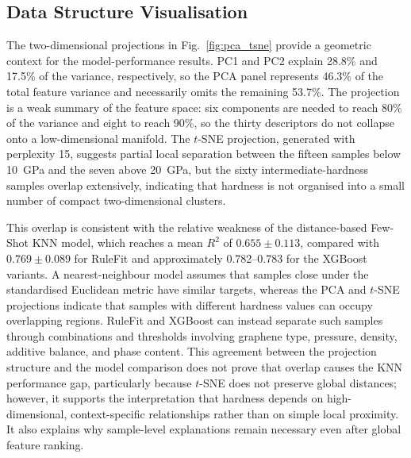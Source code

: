 \documentclass[pdflatex,sn-mathphys-num]{sn-jnl}%
\newif\ifrevmarks%
\newcommand{\revmark}[1]{\ifrevmarks\textcolor{revblue}{#1}\else#1\fi}%
\theoremstyle{thmstyleone}%
\theoremstyle{thmstyletwo}%
\theoremstyle{thmstylethree}%
\begin{document}
\subsection{Data Structure Visualisation}
\label{sec:datastructure}

\revmark{The two-dimensional projections in Fig.~\ref{fig:pca_tsne} provide a geometric context for the model-performance results. PC1 and PC2 explain 28.8\% and 17.5\% of the variance, respectively, so the PCA panel represents 46.3\% of the total feature variance and necessarily omits the remaining 53.7\%. The projection is a weak summary of the feature space: six components are needed to reach 80\% of the variance and eight to reach 90\%, so the thirty descriptors do not collapse onto a low-dimensional manifold. The $t$-SNE projection, generated with perplexity 15, suggests partial local separation between the fifteen samples below 10~GPa and the seven above 20~GPa, but the sixty intermediate-hardness samples overlap extensively, indicating that hardness is not organised into a small number of compact two-dimensional clusters.}

This overlap is consistent with the relative weakness of the distance-based Few-Shot KNN model, which reaches a mean $R^2$ of $0.655 \pm 0.113$, compared with $0.769 \pm 0.089$ for RuleFit and approximately 0.782--0.783 for the XGBoost variants. A nearest-neighbour model assumes that samples close under the standardised Euclidean metric have similar targets, whereas the PCA and $t$-SNE projections indicate that samples with different hardness values can occupy overlapping regions. RuleFit and XGBoost can instead separate such samples through combinations and thresholds involving graphene type, pressure, density, additive balance, and phase content. This agreement between the projection structure and the model comparison does not prove that overlap causes the KNN performance gap, particularly because $t$-SNE does not preserve global distances; however, it supports the interpretation that hardness depends on high-dimensional, context-specific relationships rather than on simple local proximity. It also explains why sample-level explanations remain necessary even after global feature ranking.
\end{document}
